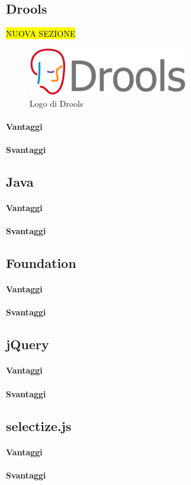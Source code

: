 \subsection{Drools}
	\hl{NUOVA SEZIONE}
	\begin{figure}[H]
		\begin{center}
			\includegraphics[width=7cm]{Pics/drools-logo.png}
			\caption{Logo di Drools}
			\label{fig:DroolsLogo}
		\end{center}
	\end{figure}
	
	
\paragraph{Vantaggi}
\paragraph{Svantaggi}
\subsection{Java}
\paragraph{Vantaggi}
\paragraph{Svantaggi}
\subsection{Foundation}
\paragraph{Vantaggi}
\paragraph{Svantaggi}
\subsection{jQuery}
\paragraph{Vantaggi}
\paragraph{Svantaggi}
\subsection{selectize.js}
\paragraph{Vantaggi}
\paragraph{Svantaggi}